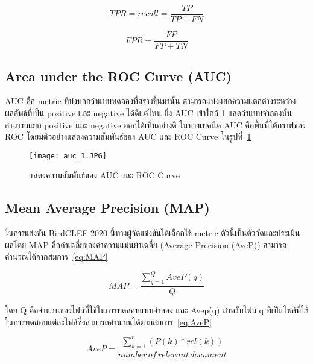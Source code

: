\begin{equation}
    TPR = recall = \frac{TP}{TP + FN}
    \label{eq:TPR}
\end{equation}

\begin{equation}
    FPR = \frac{FP}{FP + TN}
    \label{eq:FPR}
\end{equation}

\subsection{Area under the ROC Curve (AUC)}
AUC คือ metric ที่บ่งบอกว่าแบบทดลองที่สร้างขึ้นมานั้น สามารถแบ่งแยกความแตกต่างระหว่างผลลัพธ์ที่เป็น 
positive และ negative ได้ดีแค่ไหน ยิ่ง AUC เข้าใกล้ 1 แสดว่าแบบจำลองนั้นสามารถแยก positive และ negative 
ออกได้เป็นอย่างดี ในทางเทคนิค AUC คือพื้นที่ใต้กราฟของ ROC โดยมีตัวอย่างแสดงความสัมพันธ์ของ AUC และ ROC Curve 
ในรูปที่~\ref{Fig:auc_0.4,5789}

\begin{figure}[h]
    \centering
    \texttt{[image: auc\_1.JPG]}
    \caption{แสดงความสัมพันธ์ของ AUC และ ROC Curve}
    \label{Fig:auc_0.4,5789}
\end{figure}

\subsection{Mean Average Precision (MAP)}
ในการแข่งขัน BirdCLEF 2020 นี้ทางผู้จัดแข่งขันได้เลือกใช้ metric ตัวนี้เป็นตัววัดและประเมินผลโดย MAP 
คือค่าเฉลี่ยของค่าความแม่นยำเฉลี่ย (Average Precision (AveP)) สามารถคำนวณได้จากสมการ~\ref{eq:MAP}

\begin{equation}
    MAP = \frac{\sum_{q=1}^{Q}AveP(q)}{Q}
    \label{eq:MAP}
\end{equation}

โดย Q คือจำนวนของไฟล์ที่ใช้ในการทดสอบแบบจำลอง และ Avep(q) 
สำหรับไฟล์ q ที่เป็นไฟล์ที่ใช้ในการทดสอบแต่ละไฟล์ซึ่งสามารถคำนวณได้ตามสมการ~\ref{eq:AveP}

\begin{equation}
    AveP = \frac{\sum_{k=1}^{n}(P(k)*rel(k))}{number\, of\, relevant\, document}
    \label{eq:AveP}
\end{equation}

